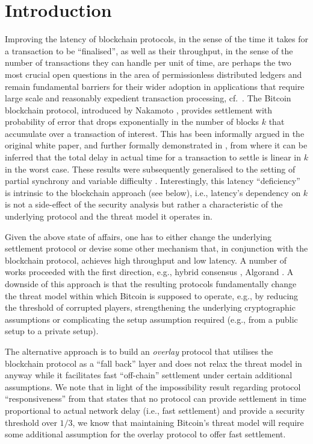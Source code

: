 
\section{Introduction}
\label{sec:intro}

Improving the latency of blockchain protocols, in the sense of the time it takes
for a transaction to be ``finalised'', as well as their throughput, in the sense
of the number of transactions they can handle per unit of time, are perhaps the
two most crucial open questions in the area of permissionless distributed
ledgers and remain fundamental barriers for their wider adoption in applications
that require large scale and reasonably expedient transaction processing,
cf.~\cite{scaling}. The Bitcoin blockchain protocol, introduced by Nakamoto
\cite{bitcoin}, provides settlement with probability of error that drops
exponentially in the number of blocks $k$ that accumulate over a transaction of
interest. This has been informally argued in the original white paper, and
further formally demonstrated in \cite{gkl}, from where it can be inferred that
the total delay in actual time for a transaction to settle is linear in $k$ in
the worst case. These results were subsequently generalised to the setting of
partial synchrony \cite{PSS16} and variable difficulty
\cite{DBLP:conf/crypto/GarayKL17}. Interestingly, this latency ``deficiency'' is
intrinsic to the blockchain approach (see below), i.e., latency's dependency on
$k$ is not a side-effect of the security analysis but rather a characteristic of
the underlying protocol and the threat model it operates in.

Given the above state of affairs, one has to either change the underlying
settlement protocol or devise some other mechanism that, in conjunction with the
blockchain protocol, achieves high throughput and low latency. A number of works
proceeded with the first direction, e.g., hybrid consensus
\cite{DBLP:conf/wdag/PassS17},  Algorand \cite{DBLP:journals/corr/Micali16}. A
downside of this approach is that the resulting protocols fundamentally change
the threat model within which Bitcoin is supposed to operate, e.g., by reducing
the threshold of corrupted players,  strengthening the underlying cryptographic
assumptions or complicating the setup assumption required (e.g., from a public setup
to a private setup).

The alternative approach is to build an {\em overlay} protocol that utilises the
blockchain protocol as a ``fall back'' layer and does not relax the threat model in anyway
while it facilitates fast ``off-chain''
settlement under certain additional assumptions.  
We note that in light of the
impossibility result regarding protocol ``responsiveness'' from
\cite{DBLP:conf/wdag/PassS17} that states that no protocol can provide
settlement in time proportional to actual network delay (i.e., fast settlement) 
and provide a security
threshold over $1/3$, we know that maintaining Bitcoin's threat model will
require some additional assumption for the overlay protocol to offer fast settlement. 

